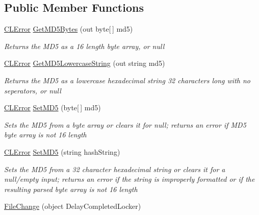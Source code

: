 \subsection*{Public Member Functions}
\begin{DoxyCompactItemize}
\item 
\hyperlink{class_cloud_api_public_1_1_model_1_1_c_l_error}{C\-L\-Error} \hyperlink{class_cloud_api_public_1_1_model_1_1_file_change_a5627d09048a4ef6ada04b09161af374f}{Get\-M\-D5\-Bytes} (out byte\mbox{[}$\,$\mbox{]} md5)
\begin{DoxyCompactList}\small\item\em Returns the M\-D5 as a 16 length byte array, or null \end{DoxyCompactList}\item 
\hyperlink{class_cloud_api_public_1_1_model_1_1_c_l_error}{C\-L\-Error} \hyperlink{class_cloud_api_public_1_1_model_1_1_file_change_ac993cd49c746972e2f557a5bda7ecd0a}{Get\-M\-D5\-Lowercase\-String} (out string md5)
\begin{DoxyCompactList}\small\item\em Returns the M\-D5 as a lowercase hexadecimal string 32 characters long with no seperators, or null \end{DoxyCompactList}\item 
\hyperlink{class_cloud_api_public_1_1_model_1_1_c_l_error}{C\-L\-Error} \hyperlink{class_cloud_api_public_1_1_model_1_1_file_change_afe3e710aa632b5c7091843dcc2fd8dcc}{Set\-M\-D5} (byte\mbox{[}$\,$\mbox{]} md5)
\begin{DoxyCompactList}\small\item\em Sets the M\-D5 from a byte array or clears it for null; returns an error if M\-D5 byte array is not 16 length \end{DoxyCompactList}\item 
\hyperlink{class_cloud_api_public_1_1_model_1_1_c_l_error}{C\-L\-Error} \hyperlink{class_cloud_api_public_1_1_model_1_1_file_change_a8843655fa58db477e9520d5f055b6406}{Set\-M\-D5} (string hash\-String)
\begin{DoxyCompactList}\small\item\em Sets the M\-D5 from a 32 character hexadecimal string or clears it for a null/empty input; returns an error if the string is improperly formatted or if the resulting parsed byte array is not 16 length \end{DoxyCompactList}\item 
\hyperlink{class_cloud_api_public_1_1_model_1_1_file_change_af7e47a037f28e2ef8c2b76ca0157cebf}{File\-Change} (object Delay\-Completed\-Locker)

\end{DoxyCompactItemize}
